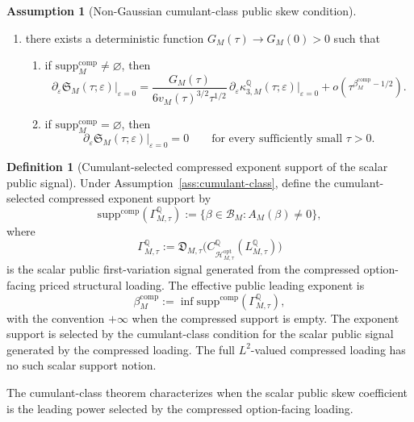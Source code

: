 \documentclass[11pt,a4paper]{amsart}
\theoremstyle{plain}
\theoremstyle{definition}
\newtheorem{definition}[theorem]{Definition}
\newtheorem{assumption}[theorem]{Assumption}
\theoremstyle{remark}
\newcommand{\QQ}{\mathbb{Q}}
\newcommand{\cH}{\mathcal{H}}
\begin{document}
\begin{assumption}[Non-Gaussian cumulant-class public skew condition]
\begin{enumerate}[label=(\roman*)]
\begin{enumerate}[label=(\alph*)]
\[        =
        0
        \qquad
        \text{for every sufficiently small }\tau>0.
\]
\end{enumerate}
\item there exists a deterministic function \(G_M(\tau)\to G_M(0)>0\) such that
\begin{enumerate}[label=(\alph*)]
\item if \(\mathrm{supp}^{\mathrm{comp}}_M\neq\varnothing\), then
\[
        \partial_\varepsilon
        \mathfrak S_M(\tau;\varepsilon)\big|_{\varepsilon=0}
        =
        \frac{G_M(\tau)}{6v_M(\tau)^{3/2}\tau^{1/2}}\,
        \partial_\varepsilon
        \kappa_{3,M}^\QQ(\tau;\varepsilon)\big|_{\varepsilon=0}
        +
        o\!\left(\tau^{\beta_M^{\mathrm{comp}}-1/2}\right).
\]
\item if \(\mathrm{supp}^{\mathrm{comp}}_M=\varnothing\), then
\[
        \partial_\varepsilon
        \mathfrak S_M(\tau;\varepsilon)\big|_{\varepsilon=0}
        =
        0
        \qquad
        \text{for every sufficiently small }\tau>0.
\]
\end{enumerate}
\end{enumerate}
\end{assumption}

\begin{definition}[Cumulant-selected compressed exponent support of the scalar public signal]\label{def:compressed-support}
Under Assumption~\ref{ass:cumulant-class}, define the cumulant-selected compressed exponent
support by
\[
        \mathrm{supp}^{\mathrm{comp}}(\Gamma_{M,\tau}^\QQ)
        :=
        \{\beta\in\mathcal B_M:A_M(\beta)\neq0\},
\]
where
\[
        \Gamma_{M,\tau}^\QQ
        :=
        \mathfrak D_{M,\tau}
        \bigl(C_{\cH_{M,\tau}^{\mathrm{opt}}}^\QQ(L_{M,\tau}^\QQ)\bigr)
\]
is the scalar public first-variation signal generated from the compressed option-facing priced
structural loading.  The effective public leading exponent is
\[
        \beta_M^{\mathrm{comp}}
        :=
        \inf \mathrm{supp}^{\mathrm{comp}}(\Gamma_{M,\tau}^\QQ),
\]
with the convention \(+\infty\) when the compressed support is empty.
The exponent support is selected by the cumulant-class condition for the scalar public signal
generated by the compressed loading.  The full \(L^2\)-valued compressed loading has no such scalar
support notion.
\end{definition}

The cumulant-class theorem characterizes when the scalar public skew coefficient is the leading
power selected by the compressed option-facing loading.
\end{document}
